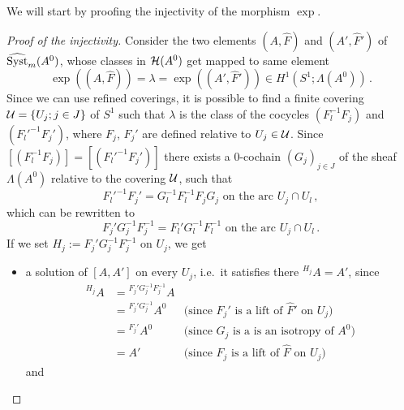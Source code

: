 We will start by proofing the injectivity of the morphism $\exp$.
\begin{proof}[Proof of the injectivity]
  Consider the two elements $(A,\hat F)$ and $(A',\hat F')$ of
  $\widehat{\operatorname{Syst}}_m(A^0)$, whose classes in $\mathcal{H}(A^0)$ get mapped to same element
  \[
    \exp((A,\hat F))=\lambda=\exp((A',\hat F'))
      \in H^1(S^1;\Lambda(A^0)) \,.
  \]
  Since we can use refined coverings, it is possible to find a finite covering
  $\mathcal{U}=\{U_j;j\in J\}$ of $S^1$ such that $\lambda$ is the class of the
  cocycles $(F_l^{-1}F_j)$ and $(F_l'^{-1}F_j')$, where $F_j$, $F_j'$ are
  defined relative to $U_j\in\mathcal{U}$.
  Since $[(F_l^{-1}F_j)]=[(F_l'^{-1}F_j')]$ there exists a
  $0$-cochain $(G_j)_{j\in J}$ of the sheaf $\Lambda(A^0)$ relative to the
  covering $\mathcal{U}$, such that
  \[
    F_l'^{-1}F_j'=G_l^{-1}F_l^{-1}F_jG_j
    \text{~on~the~arc~} U_j\cap U_l \,,
  \]
  which can be rewritten to
  \[
    F_j'G_j^{-1}F_j^{-1} = F_l'G_l^{-1}F_l^{-1}
    \text{~on~the~arc~} U_j\cap U_l \,.
  \]
  If we set $H_j:=F_j'G_{j}^{-1}F_j^{-1}$ on $U_{j}$, we get
  \begin{itemize}
    \item a solution of $[A,A']$ on every $U_j$, i.e.\ it
      satisfies there ${}^{H_j}A=A'$, since
      \begin{align*}
        {}^{H_j}A &= {}^{F_j'G_{j}^{-1}F_j^{-1}}A
        \\&={}^{F_j'G_{j}^{-1}}A^0
        & \text{(since $F_j'$ is a lift of $\hat F'$ on $U_j$)}
        \\&={}^{F_j'}A^0
        & \text{(since $G_j$ is a is an isotropy of $A^0$)}
        \\&=A'
        & \text{(since $F_j$ is a lift of $\hat F$ on $U_j$)}
      \end{align*}
      \PROBLEM[Needs lemma ${}^{FF'}A={}^F\left({}^{F'}A\right)$]
      and

\end{itemize}
\end{proof}
